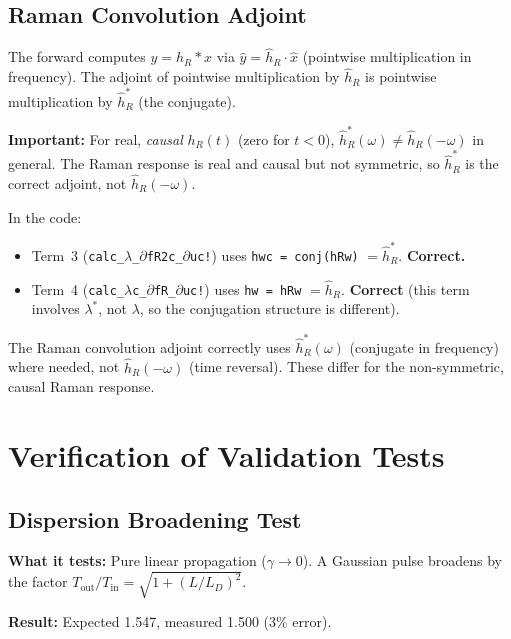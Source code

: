 \documentclass[12pt,a4paper]{article}
\theoremstyle{definition}
\begin{document}
\subsection{Raman Convolution Adjoint}

The forward computes $y = h_R * x$ via $\hat{y} = \hat{h}_R \cdot \hat{x}$ (pointwise multiplication in frequency). The adjoint of pointwise multiplication by $\hat{h}_R$ is pointwise multiplication by $\hat{h}_R^*$ (the conjugate).

\textbf{Important:} For real, \emph{causal} $h_R(t)$ (zero for $t<0$), $\hat{h}_R^*(\omega) \neq \hat{h}_R(-\omega)$ in general. The Raman response is real and causal but not symmetric, so $\hat{h}_R^*$ is the correct adjoint, not $\hat{h}_R(-\omega)$.

In the code:
\begin{itemize}[leftmargin=*]
\item Term~3 (\texttt{calc\_$\lambda$\_$\partial$fR2c\_$\partial$uc!}) uses \texttt{hwc = conj(hRw)} $= \hat{h}_R^*$. \textbf{Correct.}
\item Term~4 (\texttt{calc\_$\lambda$c\_$\partial$fR\_$\partial$uc!}) uses \texttt{hw = hRw} $= \hat{h}_R$. \textbf{Correct} (this term involves $\lambda^*$, not $\lambda$, so the conjugation structure is different).
\end{itemize}

\begin{verified}
The Raman convolution adjoint correctly uses $\hat{h}_R^*(\omega)$ (conjugate in frequency) where needed, not $\hat{h}_R(-\omega)$ (time reversal). These differ for the non-symmetric, causal Raman response.
\end{verified}


\section{Verification of Validation Tests}
\label{sec:validation}

\subsection{Dispersion Broadening Test}

\textbf{What it tests:} Pure linear propagation ($\gamma \to 0$). A Gaussian pulse broadens by the factor $T_{\text{out}}/T_{\text{in}} = \sqrt{1 + (L/L_D)^2}$.

\textbf{Result:} Expected 1.547, measured 1.500 (3\% error).
\end{document}
